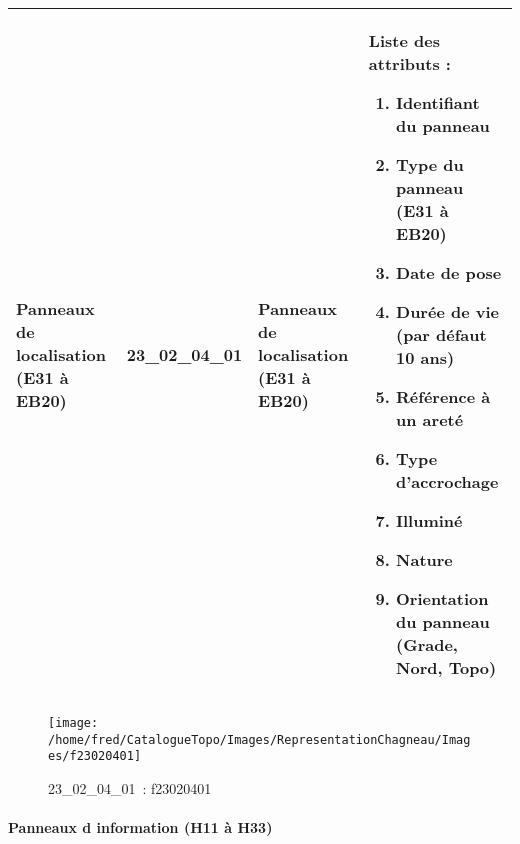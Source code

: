 \documentclass[12pt,titlepage]{book}
\begin{document}
\renewcommand{\arraystretch}{1.2}
\begin{supertabular}{|p{10cm}|c|p{13cm}|p{12cm}|}
 Panneaux de localisation (E31 à EB20) & 23\_02\_04\_01 & Panneaux de localisation (E31 à EB20) & Liste des attributs :
\begin{enumerate}
  \item Identifiant du panneau  \item Type du panneau (E31 à EB20)  \item Date de pose  \item Durée de vie (par défaut 10 ans)  \item Référence à un areté  \item Type d'accrochage  \item Illuminé  \item Nature  \item Orientation du panneau (Grade, Nord, Topo)\end{enumerate}
\\
\hline
\end{supertabular}
\begin{figure}[h!]
  \hfill         %
  \begin{minipage}[t]{3cm}
    \begin{center}
      \texttt{[image: /home/fred/CatalogueTopo/Images/RepresentationChagneau/Images/f23020401]}
      \caption[~23\_02\_04\_01]{\small{23\_02\_04\_01~:} \tiny{f23020401}}\label{f23020401}
    \end{center}
  \end{minipage}
\end{figure}


\paragraph{Panneaux d information (H11 à H33)}
\noindent
\vspace{\baselineskip}
\end{document}
